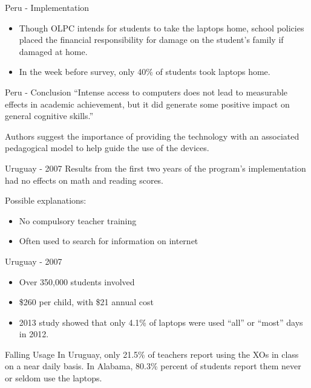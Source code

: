 \documentclass{beamer}
\begin{document}
\begin{frame}{Peru - Implementation}
\begin{itemize}
\item Though OLPC intends for students to take the laptops home, school policies placed the financial responsibility for damage on the student's family if damaged at home.
\item In the week before survey, only 40\% of students took laptops home.
\end{itemize}
\end{frame}

\begin{frame}{Peru - Conclusion}
``Intense access to computers does not lead to measurable effects in academic achievement, but it did generate some positive impact on general cognitive skills.'' %

Authors suggest the importance of providing the technology with an associated pedagogical model to help guide the use of the devices.
\end{frame}

\begin{frame}{Uruguay - 2007}
Results from the first two years of the program's implementation had \alert{no effects} on math and reading scores.\cite{uru}

Possible explanations:
\begin{itemize}
\item No compulsory teacher training
\item Often used to search for information on internet
\end{itemize}
\end{frame}

\begin{frame}{Uruguay - 2007}
\begin{itemize}
\item Over 350,000 students involved
\item \$260 per child, with \$21 annual cost
\item 2013 study showed that \alert{only 4.1\%} of laptops were used ``all'' or ``most'' days in 2012.
\end{itemize}
\end{frame}

\begin{frame}{Falling Usage}
In Uruguay, only 21.5\% of teachers report using the XOs in class on a near daily basis. In Alabama, 80.3\% percent of students report them never or seldom use the laptops. \cite{mark}
\end{frame}
\end{document}
